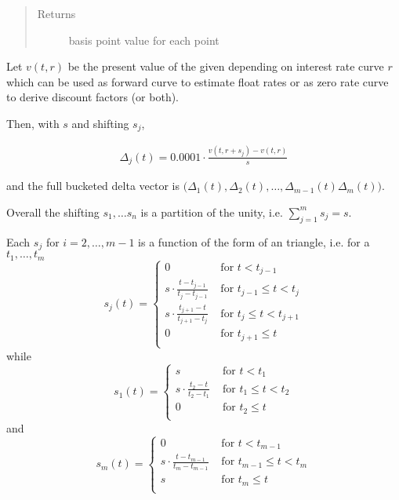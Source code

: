 \documentclass[a4paper,10pt,english]{sphinxmanual}
\begin{document}
\begin{fulllineitems}
\begin{quote}
\begin{description}
\begin{itemize}
\end{itemize}

\item[{Returns}] \leavevmode
\sphinxAtStartPar
{} \sphinxhyphen{} basis point value for each  point

\end{description}\end{quote}

\sphinxAtStartPar
Let \(v(t, r)\) be the present value of the given 
depending on interest rate curve \(r\)
which can be used as forward curve to estimate float rates
or as zero rate curve to derive discount factors (or both).

\sphinxAtStartPar
Then, with  \(s\) and shifting \(s_j\),

\sphinxAtStartPar
\begin{equation*}
\begin{split}\Delta_j(t) = 0.0001 \cdot \frac{v(t, r + s_j) - v(t, r)}{s}\end{split}
\end{equation*}

\sphinxAtStartPar
and the full bucketed delta vector is
\(\big(\Delta_1(t), \Delta_2(t), \dots, \Delta_{m-1}(t) \Delta_m(t)\big)\).

\sphinxAtStartPar
Overall the shifting \(s_1, \dots s_n\) is a partition of the unity,
i.e. \(\sum_{j=1}^m s_j = s\).

\sphinxAtStartPar
Each \(s_j\) for \(i=2, \dots, m-1\) is a function of the form of an triangle,
i.e. for a  \(t_1, \dots, t_m\)
\[
s_j(t) =
\left\{
\begin{array}{cl}
    0 & \text{ for } t < t_{j-1} \\
    s \cdot \frac{t-t_{j-1}}{t_j-t_{j-1}}
        & \text{ for } t_{j-1} \leq t < t_j \\
    s \cdot \frac{t_{j+1}-t}{t_{j+1}-t_j}
        & \text{ for } t_j \leq t < t_{j+1} \\
    0 & \text{ for } t_{j+1} \leq t \\
\end{array}
\right.
\]
\sphinxAtStartPar
while
\[
s_1(t) =
\left\{
\begin{array}{cl}
    s & \text{ for } t < t_1 \\
    s \cdot \frac{t_2-t}{t_2-t_1} & \text{ for } t_1 \leq t < t_2 \\
    0 & \text{ for } t_2 \leq t \\
\end{array}
\right.
\]
\sphinxAtStartPar
and
\[
s_m(t) =
\left\{
\begin{array}{cl}
    0 & \text{ for } t < t_{m-1} \\
    s \cdot \frac{t-t_{m-1}}{t_m-t_{m-1}}
        & \text{ for } t_{m-1} \leq t < t_m \\
    s & \text{ for } t_m \leq t \\
\end{array}
\right.
\]
\end{fulllineitems}
\end{document}
